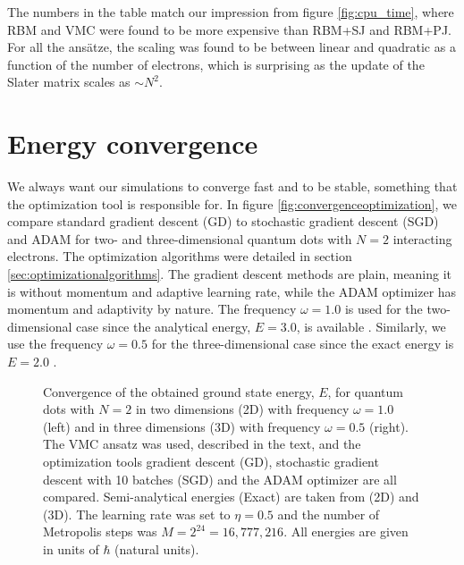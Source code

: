 The numbers in the table match our impression from figure \eqref{fig:cpu_time}, where RBM and VMC were found to be more expensive than RBM+SJ and RBM+PJ. For all the ansätze, the scaling was found to be between linear and quadratic as a function of the number of electrons, which is surprising as the update of the Slater matrix scales as $\sim N^2$. 

\section{Energy convergence}
We always want our simulations to converge fast and to be stable, something that the optimization tool is responsible for. In figure \eqref{fig:convergenceoptimization}, we compare standard gradient descent (GD) to stochastic gradient descent (SGD) and ADAM for two- and three-dimensional quantum dots with $N=2$ interacting electrons. The optimization algorithms were detailed in section \ref{sec:optimizationalgorithms}. The gradient descent methods are plain, meaning it is without momentum and adaptive learning rate, while the ADAM optimizer has momentum and adaptivity by nature. The frequency $\omega=1.0$ is used for the two-dimensional case since the analytical energy, $E=3.0$, is available \supercite{taut_two_1993}. Similarly, we use the frequency $\omega=0.5$ for the three-dimensional case since the exact energy is $E=2.0$ \supercite{taut_two_1994}. 

\begin{figure}
	\centering 
	\subfloat{{}}
	\caption{Convergence of the obtained ground state energy, $E$, for quantum dots with $N=2$ in two dimensions (2D) with frequency $\omega=1.0$ (left) and in three dimensions (3D) with frequency $\omega=0.5$ (right). The VMC ansatz was used, described in the text, and the optimization tools gradient descent (GD), stochastic gradient descent with 10 batches (SGD) and the ADAM optimizer are all compared. Semi-analytical energies (Exact) are taken from \citet{taut_two_1993} (2D) and \citet{taut_two_1994} (3D). The learning rate was set to $\eta=0.5$ and the number of Metropolis steps was $M=2^{24}=16,777,216$. All energies are given in units of $\hbar$ (natural units).}
	\label{fig:convergenceoptimization}
\end{figure} 

